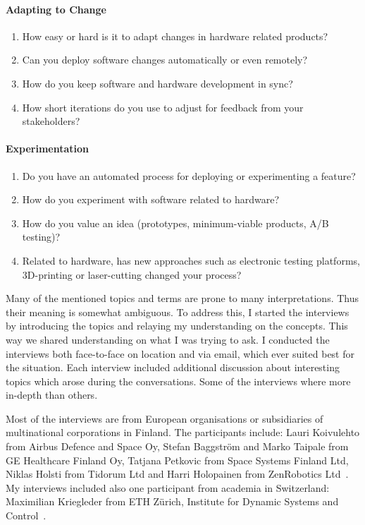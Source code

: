 \documentclass[english]{tktltiki2}
\begin{document}
\paragraph{Adapting to Change}

\begin{enumerate}[resume]

    \item How easy or hard is it to adapt changes in hardware related products?
    \item Can you deploy software changes automatically or even remotely?
    \item How do you keep software and hardware development in sync?
    \item How short iterations do you use to adjust for feedback from your stakeholders?

\end{enumerate}

\paragraph{Experimentation}

\begin{enumerate}[resume]

    \item Do you have an automated process for deploying or experimenting a feature?
    \item How do you experiment with software related to hardware?
    \item How do you value an idea (prototypes, minimum-viable products, A/B testing)?
    \item Related to hardware, has new approaches such as electronic testing platforms, 3D-printing or laser-cutting changed your process?

\end{enumerate}

Many of the mentioned topics and terms are prone to many interpretations. Thus their meaning is somewhat ambiguous. To address this, I started the interviews by introducing the topics and relaying my understanding on the concepts. This way we shared understanding on what I was trying to ask. I conducted the interviews both face-to-face on location and via email, which ever suited best for the situation. Each interview included additional discussion about interesting topics which arose during the conversations. Some of the interviews where more in-depth than others.

Most of the interviews are from European organisations or subsidiaries of multinational corporations in Finland. The participants include: Lauri Koivulehto from Airbus Defence and Space Oy, Stefan Baggström and Marko Taipale from GE Healthcare Finland Oy, Tatjana Petkovic from Space Systems Finland Ltd, Niklas Holsti from Tidorum Ltd and Harri Holopainen from ZenRobotics Ltd~\cite{Koi15, BT15, Pet15, Hol15b, Hol15a}. My interviews included also one participant from academia in Switzerland: Maximilian Kriegleder from ETH Zürich, Institute for Dynamic Systems and Control~\cite{Kri15}.
\end{document}
